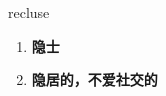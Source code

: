 
\begin{frame}
{\huge recluse}
\begin{center}
\begin{enumerate}\Large
  \item \textbf{隐士}
  \item \textbf{隐居的，不爱社交的}
\end{enumerate}
\end{center}
\end{frame}
